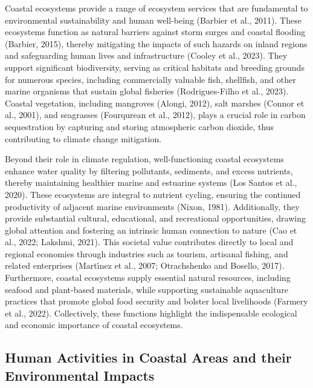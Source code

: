 \documentclass[
  letterpaper,
  11pt,
  english,
  singlespacing,
  headsepline]{MastersDoctoralThesis}
\begin{document}
\begin{spacing}{1.5}
\begin{adjustwidth}{-10cm}{-10cm}
\begin{figure}
\end{figure}%

\end{adjustwidth} 

Coastal ecosystems provide a range of ecosystem services that are
fundamental to environmental sustainability and human well-being
(Barbier et al., 2011). These ecosystems function as natural barriers
against storm surges and coastal flooding (Barbier, 2015), thereby
mitigating the impacts of such hazards on inland regions and
safeguarding human lives and infrastructure (Cooley et al., 2023). They
support significant biodiversity, serving as critical habitats and
breeding grounds for numerous species, including commercially valuable
fish, shellfish, and other marine organisms that sustain global
fisheries (Rodrigues-Filho et al., 2023). Coastal vegetation, including
mangroves (Alongi, 2012), salt marshes (Connor et al., 2001), and
seagrasses (Fourqurean et al., 2012), plays a crucial role in carbon
sequestration by capturing and storing atmospheric carbon dioxide, thus
contributing to climate change mitigation.

Beyond their role in climate regulation, well-functioning coastal
ecosystems enhance water quality by filtering pollutants, sediments, and
excess nutrients, thereby maintaining healthier marine and estuarine
systems (Los Santos et al., 2020). These ecosystems are integral to
nutrient cycling, ensuring the continued productivity of adjacent marine
environments (Nixon, 1981). Additionally, they provide substantial
cultural, educational, and recreational opportunities, drawing global
attention and fostering an intrinsic human connection to nature (Cao et
al., 2022; Lakshmi, 2021). This societal value contributes directly to
local and regional economies through industries such as tourism,
artisanal fishing, and related enterprises (Martı́nez et al., 2007;
Otrachshenko and Bosello, 2017). Furthermore, coastal ecosystems supply
essential natural resources, including seafood and plant-based
materials, while supporting sustainable aquaculture practices that
promote global food security and bolster local livelihoods (Farmery et
al., 2022). Collectively, these functions highlight the indispensable
ecological and economic importance of coastal ecosystems.

\subsection{Human Activities in Coastal Areas and their Environmental
Impacts}\label{human-activities-in-coastal-areas-and-their-environmental-impacts}


\end{spacing}
\end{document}

